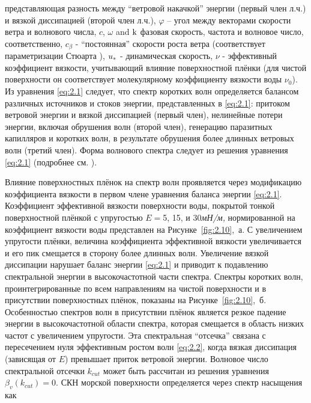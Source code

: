 \noindent представляющая разность между ``ветровой накачкой'' энергии (первый член л.ч.) и вязкой диссипацией (второй член л.ч.), $\varphi $ -- угол между векторами скорости ветра и волнового числа, $c$, $\omega $ and ${\rm k}$ фазовая скорость, частота и волновое число, соответственно, $c_{\beta } $ - ``постоянная'' скорости роста ветра (соответствует параметризации Стюарта \citep{Stewart1974}), $u_{{\rm *}} $ - динамическая скорость, $\nu $ - эффективный коэффициент вязкости, учитывающий влияние поверхностной плёнки (для чистой поверхности он соответствует молекулярному коэффициенту вязкости воды $\nu _{0} $). Из уравнения \eqref{eq:2.1} следует, что спектр коротких волн определяется балансом различных источников и стоков энергии, представленных в \eqref{eq:2.1}: притоком ветровой энергии и вязкой диссипацией (первый член), нелинейные потери энергии, включая обрушения волн (второй член), генерацию паразитных капилляров и коротких волн, в результате обрушения более длинных ветровых волн (третий член). Форма волнового спектра следует из решения уравнения \eqref{eq:2.1} (подробнее см. \citep{Kudryavtsev2005}).

Влияние поверхностных плёнок на спектр волн проявляется через модификацию коэффициента вязкости в первом члене уравнения баланса энергии \eqref{eq:2.1}.
Коэффициент эффективной вязкости поверхности воды, покрытой тонкой поверхностной плёнкой с упругостью $E=$5, 15, и 30\textit{мН/м,} нормированной на коэффициент вязкости воды представлен на Рисунке~\ref{fig:2.10},~а. С увеличением упругости плёнки, величина коэффициента эффективной вязкости увеличивается и его пик смещается в сторону более длинных волн. Увеличение вязкой диссипации нарушает баланс энергии \eqref{eq:2.1} и приводит к подавлению спектральной энергии в высокочастотной части спектра. Спектры коротких волн, проинтегрированные по всем направлениям на чистой поверхности и в присутствии поверхностных плёнок, показаны на Рисунке~\ref{fig:2.10},~б. Особенностью спектров волн в присутствии плёнок является резкое падение энергии в высокочастотной области спектра, которая смещается в область низких частот с увеличением упругости. Эта спектральная ``отсечка'' связана с пересечением нуля эффективным ростом волн \eqref{eq:2.2}, когда вязкая диссипация (зависящая от $E$) превышает приток ветровой энергии. Волновое число спектральной отсечки $k_{cut} $ может быть рассчитан из решения уравнения $\beta _{v} (k_{cut} )=0$. СКН морской поверхности определяется через спектр насыщения как



